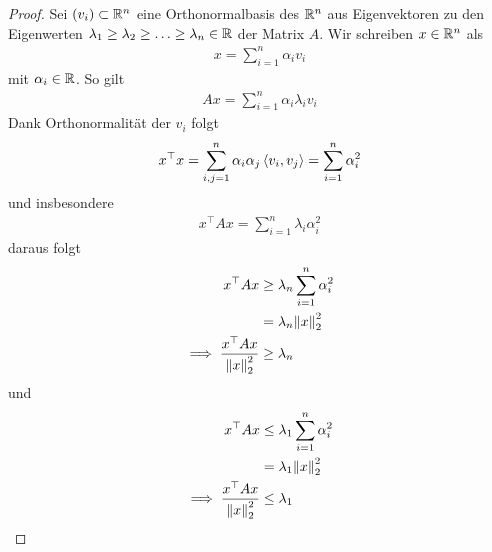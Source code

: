 \documentclass{report}
\begin{document}
	\begin{proof}
		Sei $(v_i) \subset \mathbb{R}^n$ eine Orthonormalbasis des $\mathbb{R}^n$ aus Eigenvektoren zu den Eigenwerten $\lambda_1 \geq \lambda_2 \geq \hdots \geq \lambda_n \in \mathbb{R}$ der Matrix $A$. Wir schreiben $x \in \mathbb{R}^n$ als
		\begin{align*}
			x = \sum_{i = 1}^n \alpha_i v_i
		\end{align*}
		mit $\alpha_i \in \mathbb{R}$. So gilt
		\begin{align*}
			Ax = \sum_{i = 1}^n \alpha_i \lambda_i v_i
		\end{align*}
		Dank Orthonormalität der $v_i$ folgt
		\begin{align*}
			x^\top x = \sum_{i,j = 1}^n \alpha_i \alpha_j \left\langle v_i, v_j \right\rangle = \sum_{i = 1}^n \alpha_i^2
		\end{align*}
		und insbesondere
		\begin{align*}
			x^\top Ax  = \sum_{i = 1}^n \lambda_i \alpha_i^2 
		\end{align*}
		daraus folgt
		\begin{align*}
			x^\top Ax &\geq \lambda_n \sum_{i = 1}^n \alpha_i^2\\
			 		  &= \lambda_n \norm{x}_2^2\\
			\implies \frac{x^\top A x}{\norm{x}_2^2} &\geq \lambda_n
		\end{align*}
		und
		\begin{align*}
			x^\top Ax &\leq \lambda_1 \sum_{i = 1}^n \alpha_i^2\\
			 		  &= \lambda_1 \norm{x}_2^2\\
			\implies \frac{x^\top A x}{\norm{x}_2^2} &\leq \lambda_1
		\end{align*}
	\end{proof}
\end{document}
